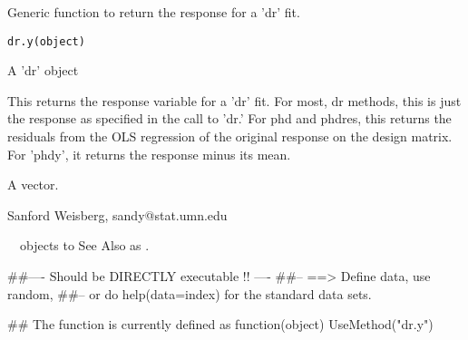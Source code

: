 \begin{Description}\relax
Generic function to return the response for a 'dr' fit.
\end{Description}
\begin{Usage}
\begin{verbatim}
dr.y(object)
\end{verbatim}
\end{Usage}
\begin{Arguments}
\begin{ldescription}
\item[\code{object}] A 'dr' object
\end{ldescription}
\end{Arguments}
\begin{Details}\relax
This returns the response variable for a 'dr' fit.  For most, dr methods, this
is just the response as specified in the call to 'dr.'  For phd and phdres, this
returns the residuals from the OLS regression of the original response on the
design matrix.  For 'phdy', it returns the response minus its mean.
\end{Details}
\begin{Value}
A vector.
\end{Value}
\begin{Author}\relax
Sanford Weisberg, sandy@stat.umn.edu
\end{Author}
\begin{SeeAlso}\relax
~~objects to See Also as .
\end{SeeAlso}
\begin{Examples}
\begin{ExampleCode}
##---- Should be DIRECTLY executable !! ----
##-- ==>  Define data, use random,
##--    or do  help(data=index)  for the standard data sets.

## The function is currently defined as
function(object) {UseMethod("dr.y")}
\end{ExampleCode}
\end{Examples}

